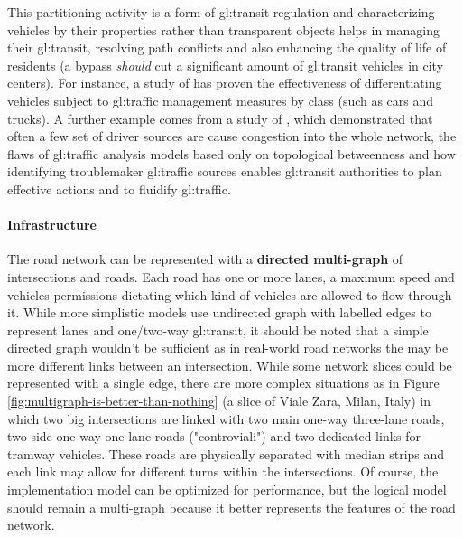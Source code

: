 This partitioning activity is a form of \gls{gl:transit} regulation and characterizing vehicles by their properties rather than transparent objects helps in managing their \gls{gl:transit}, resolving path conflicts and also enhancing the quality of life of residents (a bypass \textit{should} cut a significant amount of \gls{gl:transit} vehicles in city centers).
For instance, a study of \citeauthor{schreiter2013vehicle} \cite{schreiter2013vehicle} has proven the effectiveness of differentiating vehicles subject to \gls{gl:traffic} management measures by class (such as cars and trucks).
A further example comes from a study of \citeauthor{wang2012understanding} \cite{wang2012understanding}, which demonstrated that often a few set of driver sources are cause congestion into the whole network, the flaws of \gls{gl:traffic} analysis models based only on topological betweenness and how identifying troublemaker \gls{gl:traffic} sources enables \gls{gl:transit} authorities to plan effective actions and to fluidify \gls{gl:traffic}.

\paragraph{Infrastructure}

The road network can be represented with a \textbf{directed multi-graph} of intersections and roads. Each road has one or more lanes, a maximum speed and vehicles permissions dictating which kind of vehicles are allowed to flow through it. While more simplistic models use undirected graph with labelled edges to represent lanes and one/two-way \gls{gl:transit}, it should be noted that a simple directed graph wouldn't be sufficient as in real-world road networks the may be more different links between an intersection. While some network slices could be represented with a single edge, there are more complex situations as in Figure \ref{fig:multigraph-is-better-than-nothing} (a slice of Viale Zara, Milan, Italy) in which two big intersections are linked with two main one-way three-lane roads, two side one-way one-lane roads ("controviali") and two dedicated links for tramway vehicles. These roads are physically separated with median strips and each link may allow for different turns within the intersections. Of course, the implementation model can be optimized for performance, but the logical model should remain a multi-graph because it better represents the features of the road network.


